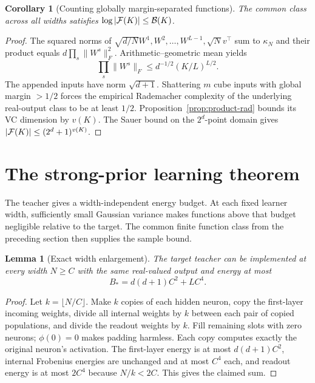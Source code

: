 \documentclass[11pt]{article}
\newtheorem{lemma}[theorem]{Lemma}
\newtheorem{corollary}[theorem]{Corollary}
\theoremstyle{remark}\newtheorem{remark}[theorem]{Remark}
\begin{document}
\begin{corollary}[Counting globally margin-separated functions]\label{cor:count}
The common class across all widths satisfies $\log|\mathcal F(K)|\le\mathcal B(K)$.
\end{corollary}
\begin{proof}
The squared norms of $\sqrt{d/N}W^1,W^2,\ldots,W^{L-1},\sqrt N v^\top$ sum to $\kappa_N$ and their product equals $d\prod_s\|W^s\|_F^2$. Arithmetic--geometric mean yields
\[
 \prod_s\|W^s\|_F\le d^{-1/2}(K/L)^{L/2}.
\]
The appended inputs have norm $\sqrt{d+1}$. Shattering $m$ cube inputs with global margin $>1/2$ forces the empirical Rademacher complexity of the underlying real-output class to be at least $1/2$. Proposition~\ref{prop:product-rad} bounds its VC dimension by $v(K)$. The Sauer bound on the $2^d$-point domain gives $|\mathcal F(K)|\le(2^d+1)^{v(K)}$.
\end{proof}

\section{The strong-prior learning theorem}
The teacher gives a width-independent energy budget. At each fixed learner width, sufficiently small Gaussian variance makes functions above that budget negligible relative to the target. The common finite function class from the preceding section then supplies the sample bound.
\begin{lemma}[Exact width enlargement]\label{lem:clone}
The target teacher can be implemented at every width $N\ge C$ with the same real-valued output and energy at most
\[
 B_*=d(d+1)C^2+LC^4.
\]
\end{lemma}
\begin{proof}
Let $k=\lfloor N/C\rfloor$. Make $k$ copies of each hidden neuron, copy the first-layer incoming weights, divide all internal weights by $k$ between each pair of copied populations, and divide the readout weights by $k$. Fill remaining slots with zero neurons; $\phi(0)=0$ makes padding harmless. Each copy computes exactly the original neuron's activation. The first-layer energy is at most $d(d+1)C^2$, internal Frobenius energies are unchanged and at most $C^4$ each, and readout energy is at most $2C^4$ because $N/k<2C$. This gives the claimed sum.
\end{proof}
\end{document}
